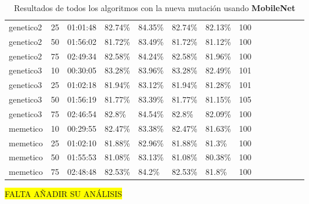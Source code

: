 \begin{sidewaystable}[htp]
\begin{adjustbox}{width=\linewidth}
\begin{tabular}{llllllllllllll}
        \rowcolor{gray!40}genetico2 & 25 & 01:01:48 & 82.74\% & 84.35\% & 82.74\% & 82.13\% & 100 \\
        \rowcolor{gray!40}genetico2 & 50 & 01:56:02 & 81.72\% & 83.49\% & 81.72\% & 81.12\% & 100 \\
        \rowcolor{gray!40}genetico2 & 75 & 02:49:34 & 82.58\% & 84.24\% & 82.58\% & 81.96\% & 100 \\
        \rowcolor{gray!10}genetico3 & 10 & 00:30:05 & 83.28\% & 83.96\% & 83.28\% & 82.49\% & 101 \\
        \rowcolor{gray!10}genetico3 & 25 & 01:02:18 & 81.94\% & 83.12\% & 81.94\% & 81.28\% & 101 \\
        \rowcolor{gray!10}genetico3 & 50 & 01:56:19 & 81.77\% & 83.39\% & 81.77\% & 81.15\% & 105 \\
        \rowcolor{gray!10}genetico3 & 75 & 02:46:54 & 82.8\% & 84.54\% & 82.8\% & 82.09\% & 100 \\
        \rowcolor{gray!40}memetico & 10 & 00:29:55 & 82.47\% & 83.38\% & 82.47\% & 81.63\% & 100 \\
        \rowcolor{gray!40}memetico & 25 & 01:02:10 & 81.88\% & 82.96\% & 81.88\% & 81.3\% & 100 \\
        \rowcolor{gray!40}memetico & 50 & 01:55:53 & 81.08\% & 83.13\% & 81.08\% & 80.38\% & 100 \\
        \rowcolor{gray!40}memetico & 75 & 02:48:48 & 82.53\% & 84.2\% & 82.53\% & 81.8\% & 100 \\
        \bottomrule
        \end{tabular}
    \end{adjustbox}
    \caption{Resultados de todos los algoritmos con la nueva mutación usando \textbf{MobileNet}}
    \label{tab:generation-rps-with-new-mutation}
\end{sidewaystable}

\colorbox{yellow}{FALTA AÑADIR SU ANÁLISIS}

